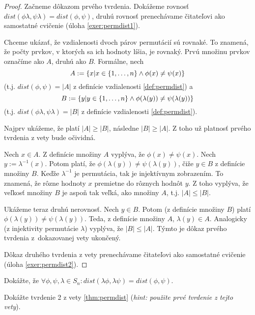 \begin{proof}
Začneme dôkazom prvého tvrdenia. 
Dokážeme rovnosť $dist(\phi \lambda, \psi \lambda) = dist(\phi, \psi)$, druhú rovnosť prenechávame čitateľovi ako samostatné cvičenie (úloha \ref{exer:permdist1}).

Chceme ukázať, že vzdialenosti dvoch párov permutácií sú rovnaké. 
To znamená, že počty prvkov, v ktorých sa ich hodnoty líšia, je rovnaký.
Prvú množinu prvkov označíme ako $A$, druhú ako $B$. 
Formálne, nech 
$$A := \left\{x | x \in \left\{1, \ldots, n\right\} \wedge \phi(x) \neq \psi(x)\right\}$$
(t.j. $dist(\phi, \psi) = |A|$ z definície vzdialenosti \ref{def:permdist}) a 
$$B := \left\{y | y \in \left\{1, \ldots, n\right\} \wedge \phi(\lambda(y)) \neq \psi(\lambda(y))\right\}$$ 
(t.j. $dist(\phi\lambda, \psi\lambda) = |B|$ z definície vzdialenosti \ref{def:permdist}).

Najprv ukážeme, že platí $|A| \geq |B|$, následne $|B| \geq |A|$.
Z toho už platnosť prvého tvrdenia z vety bude očividná.

Nech $x \in A$. 
Z definície množiny $A$ vyplýva, že $\phi(x) \neq \psi(x)$. 
Nech $y := \lambda^{-1}(x)$. Potom platí, že $\phi(\lambda(y)) \neq \psi(\lambda(y))$, čiže $y \in B$ z definície množiny $B$.
Keďže $\lambda^{-1}$ je permutácia, tak je injektívnym zobrazením. 
To znamená, že rôzne hodnoty $x$ premietne do rôznych hodnôt $y$. 
Z toho vyplýva, že veľkosť množiny $B$ je aspoň tak veľká, ako množiny $A$, t.j. $|A| \leq |B|$.

Ukážeme teraz druhú nerovnosť. 
Nech $y \in B$. 
Potom (z definície množiny $B$) platí $\phi(\lambda(y)) \neq \psi(\lambda(y))$. 
Teda, z definície množiny $A$, $\lambda(y) \in A$.
Analogicky (z injektivity permutácie $\lambda$) vyplýva, že $|B| \leq |A|$.
Týmto je dôkaz prvého tvrdenia z~dokazovanej vety ukončený.

Dôkaz druhého tvrdenia z vety prenechávame čitateľovi ako samostatné cvičenie (úloha \ref{exer:permdist2}).
\end{proof}

\begin{exercise}
\label{exer:permdist1}
Dokážte, že $\forall \phi, \psi, \lambda \in S_n: dist(\lambda\phi, \lambda\psi) = dist(\phi, \psi)$.
\end{exercise}

\begin{exercise}
\label{exer:permdist2}
Dokážte tvrdenie 2 z vety \ref{thm:permdist} (\emph{hint: použite prvé tvrdenie z tejto vety}).
\end{exercise}

